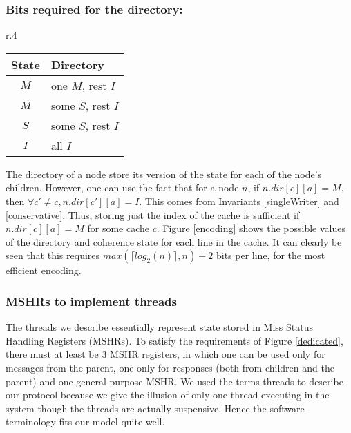 \subsubsection{Bits required for the directory:}
\begin{wrapfigure}{r}{.4\linewidth}
\begin{tabularx}{\linewidth}{|c|X|}
\hline
State & Directory \\
\hline
$M$ & one $M$, rest $I$\\
$M$ & some $S$, rest $I$\\
$S$ & some $S$, rest $I$\\
$I$ & all $I$\\
\hline
\end{tabularx}
\caption{Possible values of coherence state and directory for each cache line}
\label{encoding}
\end{wrapfigure}
The directory of a node store its version of the state for each of the node's
children. However, one can use the fact that for a node $n$, if $n.dir[c][a] =
M$, then $\forall c' \neq c, n.dir[c'][a] = I$. This comes from Invariants
\ref{singleWriter} and \ref{conservative}. Thus, storing just the index of the
cache is sufficient if $n.dir[c][a] = M$ for some cache $c$. Figure
\ref{encoding} shows the possible values of the directory and coherence state
for each line in the cache. It can clearly be seen that this requires
$max(\lceil log_2(n)\rceil, n) + 2$ bits per line, for the most efficient
encoding.

\subsubsection{MSHRs to implement threads}
The threads we describe essentially represent state stored in Miss Status Handling Registers (MSHRs). To
satisfy the requirements of Figure \ref{dedicated}, there must at least be 3
MSHR registers, in which one can be used only for messages from the parent, one
only for responses (both from children and the parent) and one general purpose
MSHR. We used the terms threads to describe our protocol because we give the
illusion of only one thread executing in the system though the threads are
actually suspensive. Hence the software terminology fits our model quite well.
